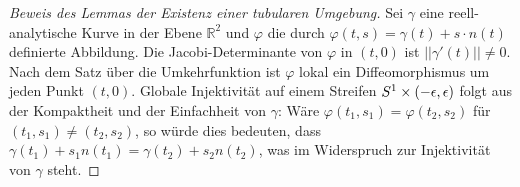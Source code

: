 \begin{proof}[Beweis des Lemmas der Existenz einer tubularen Umgebung\label{jordan:proof:tubulare_umgebung}]
    Sei $\gamma$ eine reell-analytische Kurve in der Ebene $\mathbb{R}^2$ und $\varphi$ die durch $\varphi(t,s) = \gamma(t) + s \cdot n(t)$ definierte Abbildung. 
    Die Jacobi-Determinante von $\varphi$ in $(t,0)$ ist $||\gamma'(t)|| \neq 0$. 
    Nach dem Satz über die Umkehrfunktion ist $\varphi$ lokal ein Diffeomorphismus um jeden Punkt $(t,0)$. 
    Globale Injektivität auf einem Streifen $S\textsuperscript{1} \times (-\epsilon, \epsilon)$ folgt aus der Kompaktheit und der Einfachheit von $\gamma$: 
    Wäre $\varphi(t_1,s_1) = \varphi(t_2,s_2)$ für $(t_1,s_1) \neq (t_2,s_2)$, so würde dies bedeuten, dass $\gamma(t_1) + s_1 n(t_1) = \gamma(t_2) + s_2 n(t_2)$, was im Widerspruch zur Injektivität von $\gamma$ steht.
\end{proof}
